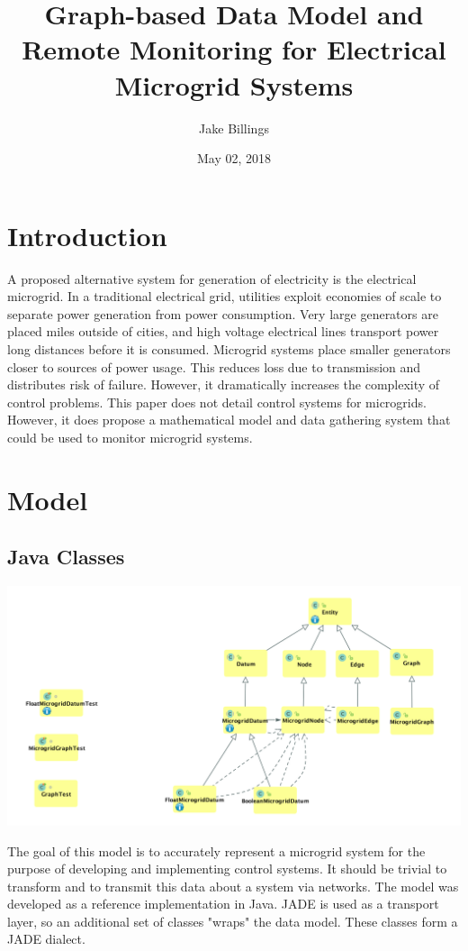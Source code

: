 \documentclass{article}
\title{Graph-based Data Model and Remote Monitoring for Electrical Microgrid Systems}
\author{Jake Billings}
\date{May 02, 2018}
\begin{document}
\maketitle

\section{Introduction}
A proposed alternative system for generation of electricity is the electrical microgrid. In a traditional electrical grid, utilities exploit economies of scale to separate power generation from power consumption. Very large generators are placed miles outside of cities, and high voltage electrical lines transport power long distances before it is consumed. Microgrid systems place smaller generators closer to sources of power usage. This reduces loss due to transmission and distributes risk of failure. However, it dramatically increases the complexity of control problems. This paper does not detail control systems for microgrids. However, it does propose a mathematical model and data gathering system that could be used to monitor microgrid systems.

\section{Model}


\subsection{Java Classes}
\includegraphics[width=\textwidth]{dataPackageClassDiagram.png}

The goal of this model is to accurately represent a microgrid system for the purpose of developing and implementing control systems. It should be trivial to transform and to transmit this data about a system via networks. The model was developed as a reference implementation in Java. JADE is used as a transport layer, so an additional set of classes "wraps" the data model. These classes form a JADE dialect.
\end{document}
